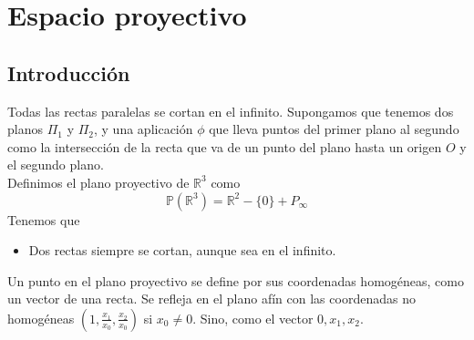 \documentclass{Geometria.tex}
\begin{document}
\chapter{Espacio proyectivo}
\section{Introducción}
Todas las rectas paralelas se cortan en el infinito. Supongamos que tenemos dos planos
\(\Pi_{1}\) y \(\Pi_{2}\), y una aplicación \(\phi \) que lleva puntos del primer plano al segundo
como la intersección de la recta que va de un punto del plano hasta un origen \(O\) y el segundo
plano.\\
Definimos el plano proyectivo de \(\mathbb{R}^{3}\) como
\[
    \mathbb{P}(\mathbb{R}^{3}) = \mathbb{R}^{2} - \{ 0 \} + P_{\infty}
\]
Tenemos que
\begin{itemize}
    \item Dos rectas siempre se cortan, aunque sea en el infinito.
\end{itemize}
Un punto en el plano proyectivo se define por sus coordenadas homogéneas, como un vector de una
recta. Se refleja en el plano afín con las coordenadas no homogéneas \((1, \frac{x_{1}}{x_{0}}
, \frac{x_{2}}{x_{0}})\) si \(x_{0} \neq 0\). Sino, como el vector \(0, x_{1}, x_{2}\).
\end{document}
